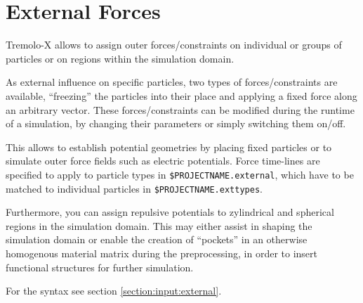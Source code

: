 \chapter{External Forces}
\label{external}

Tremolo-X allows to assign outer forces/constraints on individual or groups of particles or on regions within the simulation domain.

As external influence on specific particles, two types of forces/constraints are available, ``freezing'' the particles into their place 
and applying a fixed force along an arbitrary vector. 
These forces/constraints can be modified during the runtime of a simulation, by changing their parameters or simply switching them on/off. 

This allows to establish potential geometries by placing fixed particles or to simulate outer force fields such as electric potentials.
Force time-lines are specified to apply to particle types in {\tt \$PROJECTNAME.external}, which have to be matched to individual particles in
{\tt \$PROJECTNAME.exttypes}.

Furthermore, you can assign repulsive potentials to zylindrical and spherical regions in the simulation domain. This may either assist in shaping 
the simulation domain or enable the creation of ``pockets'' in an otherwise homogenous material matrix during the preprocessing, in order to insert functional structures for
further simulation.

For the syntax see section \ref{section:input:external}.